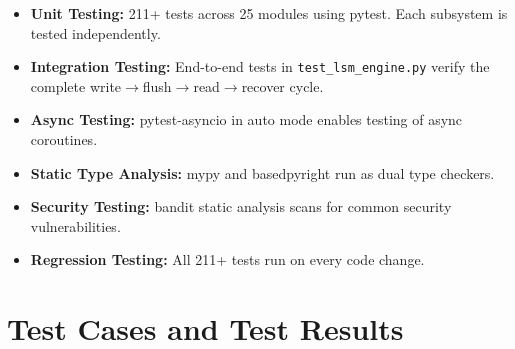 \documentclass[oneside,a4paper,12pt]{book}
\begin{document}
\begin{itemize}[leftmargin=2em]
    \item \textbf{Unit Testing:} 211+ tests across 25 modules using pytest. Each subsystem is tested independently.
    \item \textbf{Integration Testing:} End-to-end tests in \texttt{test\_lsm\_engine.py} verify the complete write$\rightarrow$flush$\rightarrow$read$\rightarrow$recover cycle.
    \item \textbf{Async Testing:} pytest-asyncio in auto mode enables testing of async coroutines.
    \item \textbf{Static Type Analysis:} mypy and basedpyright run as dual type checkers.
    \item \textbf{Security Testing:} bandit static analysis scans for common security vulnerabilities.
    \item \textbf{Regression Testing:} All 211+ tests run on every code change.
\end{itemize}

\section{Test Cases and Test Results}
\end{document}
